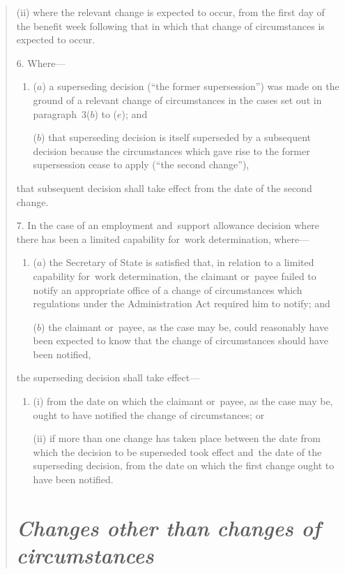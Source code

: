 \documentclass[12pt,a4paper]{article}
\begin{document}
\begin{quotation}
\begin{enumerate}
(ii) where the relevant change is expected to occur, from the first day of the benefit week following that in which that change of circumstances is expected to occur.
\end{enumerate}

\medskip

6.  Where—
\begin{enumerate}\item[]
($a$) a superseding decision (“the former supersession”) was made on the ground of a relevant change of circumstances in the cases set out in paragraph~3($b$)  to ($e$); and

($b$) that superseding decision is itself superseded by a subsequent decision because the circumstances which gave rise to the former supersession cease to apply (“the second change”),
\end{enumerate}
that subsequent decision shall take effect from the date of the second change.

\medskip

7.  In the case of an employment and~support allowance decision where there has been a limited capability for~work determination, where—
\begin{enumerate}\item[]
($a$) the Secretary of State is satisfied that, in relation to a limited capability for~work determination, the claimant or~payee failed to notify an appropriate office of a change of circumstances which regulations under the Administration Act required him to notify; and

($b$) the claimant or~payee, as the case may be, could reasonably have been expected to know that the change of circumstances should have been notified,
\end{enumerate}
the superseding decision shall take effect—
\begin{enumerate}\item[]
(i) from the date on which the claimant or~payee, as the case may be, ought to have notified the change of circumstances; or

\enlargethispage{-6\baselineskip}

(ii) if more than one change has taken place between the date from which the decision to be superseded took effect and~the date of the superseding decision, from the date on which the first change ought to have been notified.
\end{enumerate}

\section*{\itshape Changes other than changes of circumstances}


\end{quotation}
\end{document}
